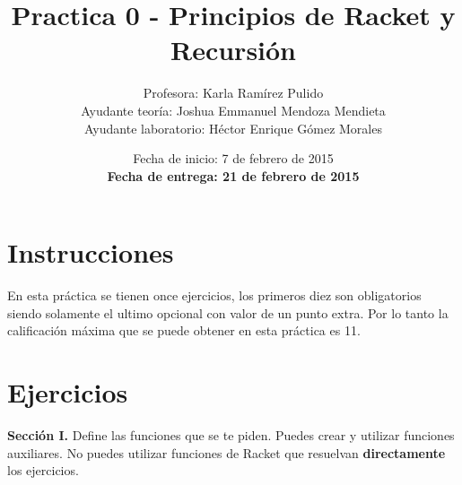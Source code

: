 \documentclass{article}
\author{Profesora: Karla Ramírez Pulido\\
  Ayudante teoría: Joshua Emmanuel Mendoza Mendieta\\
  Ayudante laboratorio: Héctor Enrique Gómez Morales}
\title{Practica 0 - Principios de Racket y Recursión}
\date{Fecha de inicio: 7 de febrero de 2015\\
  \textbf{Fecha de entrega: 21 de febrero de 2015}}
\begin{document}
\maketitle
\section{Instrucciones}
En esta práctica se tienen once ejercicios, los primeros diez son
obligatorios siendo solamente el ultimo opcional con valor de un punto
extra. Por lo tanto la calificación máxima que se puede obtener en
esta práctica es 11.
\section{Ejercicios}
\textbf{Sección I.} Define las funciones que se te piden. Puedes crear y utilizar
funciones auxiliares. No puedes utilizar funciones de Racket que
resuelvan \textbf{directamente} los ejercicios.
\end{document}
